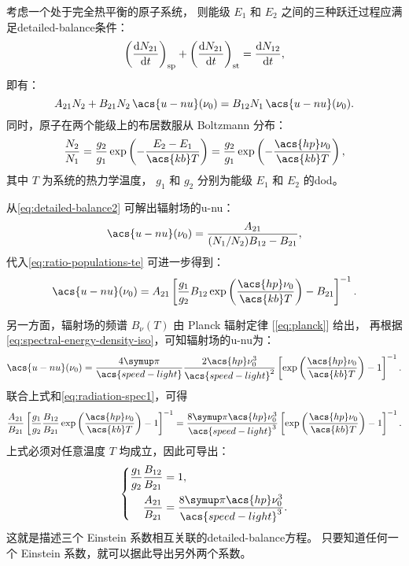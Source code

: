 考虑一个处于完全热平衡的原子系统，
则能级 $E_1$ 和 $E_2$ 之间的三种跃迁过程应满足\acf{detailed-balance}条件：
\begin{equation}
  \label{eq:detailed-balance1}
  \left( \frac{\mathrm{d}N_{21}}{\mathrm{d}t} \right)_{\mathrm{sp}}
    + \left( \frac{\mathrm{d}N_{21}}{\mathrm{d}t} \right)_{\mathrm{st}} = \frac{\mathrm{d}N_{12}}{\mathrm{d}t} ,
\end{equation}
即有：
\begin{equation}
  \label{eq:detailed-balance2}
  A_{21} N_2 + B_{21} N_2 \, \acs{u-nu}(\nu_0)
    = B_{12} N_1 \, \acs{u-nu}(\nu_0) .
\end{equation}
同时，原子在两个能级上的布居数服从 Boltzmann 分布：
\begin{equation}
  \label{eq:ratio-populations-te}
  \frac{N_2}{N_1}
    = \frac{g_2}{g_1} \exp\left( - \frac{E_2-E_1}{\acs{kb} T} \right)
    = \frac{g_2}{g_1} \exp\left( - \frac{\acs{hp} \nu_0}{\acs{kb} T} \right) ,
\end{equation}
其中 $T$ 为系统的热力学温度，
$g_1$ 和 $g_2$ 分别为能级 $E_1$ 和 $E_2$ 的\acf{dod}。

从\autoref{eq:detailed-balance2} 可解出辐射场的\acl{u-nu}：
\begin{equation}
  \acs{u-nu}(\nu_0) = \frac{A_{21}}{(N_1/N_2) B_{12} - B_{21}} ,
\end{equation}
代入\autoref{eq:ratio-populations-te} 可进一步得到：
\begin{equation}
  \label{eq:radiation-spec1}
  \acs{u-nu}(\nu_0) = A_{21} \left[ \frac{g_1}{g_2} B_{12}
    \exp\left( \frac{\acs{hp} \nu_0}{\acs{kb} T} \right)
    - B_{21} \right]^{-1} .
\end{equation}

另一方面，辐射场的频谱 $B_{\nu}(T)$ 由 Planck 辐射定律 [\autoref{eq:planck}] 给出，
再根据\autoref{eq:spectral-energy-density-iso}，可知辐射场的\acl{u-nu}为：
\begin{equation}
  \label{eq:radiation-spec2}
  \acs{u-nu}(\nu_0) = \frac{4\Cpi}{\acs{speed-light}}
    \frac{2 \acs{hp} \nu_0^3}{\acs{speed-light}^2}
    \left[ \exp\left( \frac{\acs{hp} \nu_0}{\acs{kb} T} \right)
      - 1 \right]^{-1} .
\end{equation}
联合上式和\autoref{eq:radiation-spec1}，可得
\begin{equation}
  \frac{A_{21}}{B_{21}} \left[ \frac{g_1}{g_2} \frac{B_{12}}{B_{21}}
    \exp\left( \frac{\acs{hp} \nu_0}{\acs{kb} T} \right) - 1 \right]^{-1}
  = \frac{8\Cpi \acs{hp} \nu_0^3}{\acs{speed-light}^3}
    \left[ \exp\left( \frac{\acs{hp} \nu_0}{\acs{kb} T} \right)
      - 1 \right]^{-1} .
\end{equation}
上式必须对任意温度 $T$ 均成立，因此可导出：
\begin{equation}
  \label{eq:detailed-balance}
  \left\{
    \begin{aligned}
      \frac{g_1}{g_2} \frac{B_{12}}{B_{21}} & = 1 , \\
      \frac{A_{21}}{B_{21}} & =
        \frac{8\Cpi \acs{hp} \nu_0^3}{\acs{speed-light}^3} .
    \end{aligned}
  \right.
\end{equation}
这就是描述三个 Einstein 系数相互关联的\ac{detailed-balance}方程。
只要知道任何一个 Einstein 系数，就可以据此导出另外两个系数。

